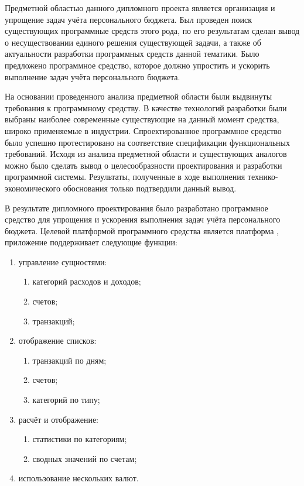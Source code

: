 
Предметной областью данного дипломного проекта является организация и упрощение задач учёта персонального бюджета.
Был проведен поиск существующих программные средств этого рода, по его результатам сделан вывод о несуществовании единого решения существующей задачи, а также об актуальности разработки программных средств данной тематики.
Было предложено программное средство, которое должно упростить и ускорить выполнение задач учёта персонального бюджета.

На основании проведенного анализа предметной области были выдвинуты требования к программному средству.
В качестве технологий разработки были выбраны наиболее современные существующие на данный момент средства, широко применяемые в индустрии.
Спроектированное программное средство было успешно протестировано на соответствие спецификации функциональных требований.
Исходя из анализа предметной области  и существующих аналогов можно было сделать вывод о целесообразности проектирования и разработки программной системы.
Результаты, полученные в ходе выполнения технико-экономического обоснования только подтвердили данный вывод.

В результате дипломного проектирования было разработано программное средство для упрощения и ускорения выполнения задач учёта персонального бюджета.
Целевой платформой программного средства является платформа \andro, приложение поддерживает следующие функции:
\begin{enumerate}
    \item управление сущностями:
    \begin{enumerate}
        \item категорий расходов и доходов;
        \item счетов;
        \item транзакций;
    \end{enumerate}
    \item отображение списков:
    \begin{enumerate}
        \item транзакций по дням;
        \item счетов;
        \item категорий по типу;
    \end{enumerate}
    \item расчёт и отображение:
    \begin{enumerate}
        \item статистики по категориям;
        \item сводных значений по счетам;
    \end{enumerate}
    \item использование нескольких валют.
\end{enumerate}

